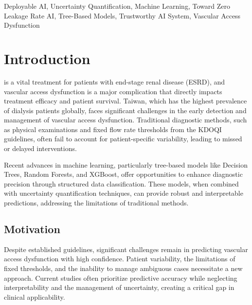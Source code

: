 \documentclass{ieeeaccess}
\begin{document}
\begin{keywords}
Deployable AI, Uncertainty Quantification, Machine Learning, Toward Zero Leakage Rate AI, Tree-Based Models, Trustworthy AI System, Vascular Access Dysfunction
\end{keywords}

\titlepgskip=-15pt

\maketitle

\section{Introduction}
\label{sec:introduction}
 is a vital treatment for patients with end-stage renal disease (ESRD), and vascular access dysfunction is a major complication that directly impacts treatment efficacy and patient survival. Taiwan, which has the highest prevalence of dialysis patients globally, faces significant challenges in the early detection and management of vascular access dysfunction. Traditional diagnostic methods, such as physical examinations and fixed flow rate thresholds from the KDOQI guidelines, often fail to account for patient-specific variability, leading to missed or delayed interventions.

Recent advances in machine learning, particularly tree-based models like Decision Trees, Random Forests, and XGBoost, offer opportunities to enhance diagnostic precision through structured data classification. These models, when combined with uncertainty quantification techniques, can provide robust and interpretable predictions, addressing the limitations of traditional methods.

\subsection{Motivation}
Despite established guidelines, significant challenges remain in predicting vascular access dysfunction with high confidence. Patient variability, the limitations of fixed thresholds, and the inability to manage ambiguous cases necessitate a new approach. Current studies often prioritize predictive accuracy while neglecting interpretability and the management of uncertainty, creating a critical gap in clinical applicability.
\end{document}
